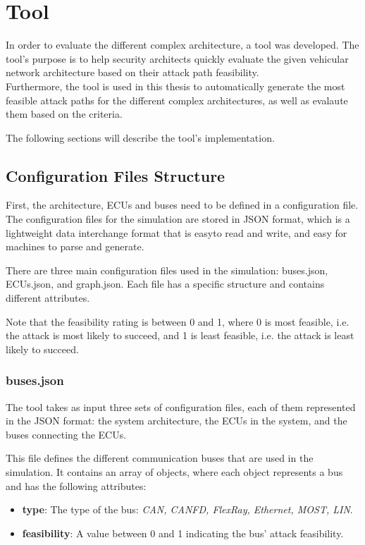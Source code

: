 \chapter{Tool}
\label{chp:tool}

In order to evaluate the different complex architecture, a tool was developed.
The tool's purpose is to help security architects quickly evaluate the given vehicular network architecture based on their \gls{attack path} feasibility.\\
Furthermore, the tool is used in this thesis to automatically generate the most feasible attack paths for the different complex architectures, 
as well as evalaute them based on the criteria.

The following sections will describe the tool's implementation.

\section{Configuration Files Structure}
\label{sec:config}

First, the architecture, ECUs and buses need to be defined in a configuration file.
The configuration files for the simulation are stored in JSON format, which is a lightweight data interchange format that is easyto read and write, and easy for machines to parse and generate.

There are three main configuration files used in the simulation: buses.json, ECUs.json, and graph.json.
Each file has a specific structure and contains different attributes.

Note that the feasibility rating is between 0 and 1, where 0 is most feasible, i.e. the attack is most likely to succeed, and 1 is least feasible, i.e. the attack is least likely to succeed.

\subsection{buses.json}
\label{sec:buses}

The tool takes as input three sets of configuration files, each of them represented in the JSON format: 
the system architecture, the ECUs in the system, and the buses connecting the ECUs. 

This file defines the different communication buses that are used in the simulation. 
It contains an array of objects, where each object represents a bus and has the following attributes:

\begin{itemize}
\item \textbf{type}: The type of the bus: \textit{CAN, CANFD, FlexRay, Ethernet, MOST, LIN}.
\item \textbf{feasibility}: A value between 0 and 1 indicating the bus' attack feasibility.
\end{itemize}

